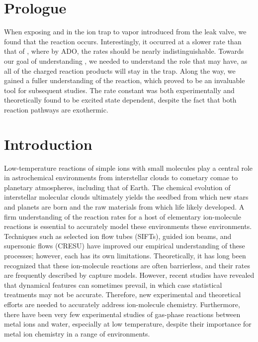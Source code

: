 \section{Prologue}
When exposing  and  in the ion trap to  vapor introduced from the leak valve, we found that the reaction  occurs. Interestingly, it occurred at a slower rate than that of , where by ADO, the rates should be nearly indistinguishable. Towards our goal of understanding , we needed to understand the role that  may have, as all of the charged reaction products will stay in the trap. Along the way, we gained a fuller understanding of the  reaction, which proved to be an invaluable tool for subsequent studies. The rate constant was both experimentally and theoretically found to be excited state dependent, despite the fact that both reaction pathways are exothermic.

\section{Introduction}
Low-temperature reactions of simple ions with small molecules play a central role in astrochemical environments from interstellar clouds to cometary comae to planetary atmospheres, including that of Earth\cite{Agundez2013,Krasnopolsky2014}. The chemical evolution of interstellar molecular clouds ultimately yields the seedbed from which new stars and planets are born and the raw materials from which life likely developed. A firm understanding of the reaction rates for a host of elementary ion-molecule reactions is essential to accurately model these environments these environments. Techniques such as selected ion flow tubes (SIFTs)\cite{Adams1976}, guided ion beams\cite{Armentrout2002}, and supersonic flows (CRESU)\cite{Sims2002} have improved our empirical understanding of these processes; however, each has its own limitations.\cite{Smith2000,Snow2008} Theoretically, it has long been recognized that these ion-molecule reactions are often barrierless, and their rates are frequently described by capture models.\cite{Gioumousis1958a} However, recent studies have revealed that dynamical features can sometimes prevail,\cite{Lourderaj2008,Li2014,Carrascosa2017} in which case statistical treatments may not be accurate.\cite{Hase2014,Clary1990} Therefore, new experimental and theoretical efforts are needed to accurately address ion-molecule chemistry. Furthermore, there have been very few experimental studies of gas-phase reactions between metal ions and water, especially at low temperature, despite their importance for metal ion chemistry in a range of environments.\cite{Highberger2001,Oppenheimer2002,VanDishoeck2013a}

